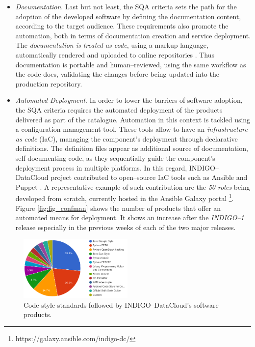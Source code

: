 \documentclass[journal]{IEEEtran}
\begin{document}
\begin{itemize}
\item \textit{Documentation}.
Last but not least, the SQA criteria sets the path for the adoption of the developed software by
defining the documentation content, according to the target audience. These requirements also 
promote the automation, both in terms of documentation creation and service deployment. The
\textit{documentation is treated as code}, using a markup language, automatically rendered and
uploaded to online repositories \cite{indigo-gitbook}. Thus documentation is portable and 
human--reviewed, using the same workflow as the code does, validating the changes before being
updated into the production repository. 

\item \textit{Automated Deployment}.
In order to lower the barriers of software adoption, the SQA criteria requires the automated 
deployment of the products delivered as part of the catalogue. Automation in this context is 
tackled using a configuration management tool. These tools allow to have an 
\textit{infrastructure as code} (IaC), managing the component's deployment through declarative
definitions. The definition files appear as additional source of documentation, 
self-documenting code, as they sequentially guide the component's deployment process in multiple
platforms. In this regard, INDIGO--DataCloud project contributed to open--source IaC tools such 
as Ansible \cite{indigo-ansible} and Puppet \cite{indigo-puppet}. A representative example of 
such contribution are the \textit{50 roles} being developed from scratch, currently hosted in
the Ansible Galaxy portal \footnote{https://galaxy.ansible.com/indigo-dc/}. Figure 
\ref{fig:fig_confman} shows the number of products that offer an automated means for deployment.
It shows an increase after the {\sl INDIGO--1} release especially in the previous weeks of each
of the two major releases.
\end{itemize}

\begin{figure}[ht]
\centering
\includegraphics[width=0.5\textwidth]{images/codestyle.png}
\caption{Code style standards followed by INDIGO--DataCloud's software products.}
\label{fig:fig_codestyle}
\end{figure}
\end{document}

